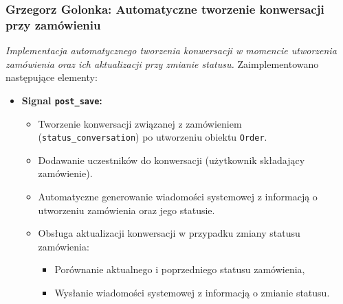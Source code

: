 \documentclass[12pt,a4paper,oneside]{article}
\theoremstyle{definition}
\numberwithin{equation}{section}
\begin{document}
\subsubsection{Grzegorz Golonka: Automatyczne tworzenie konwersacji przy zamówieniu}
\label{section:1.3.31}
\textit{
Implementacja automatycznego tworzenia konwersacji w momencie utworzenia zamówienia oraz ich aktualizacji przy zmianie statusu.
}
Zaimplementowano następujące elementy:
\begin{itemize}
    \item \textbf{Signal \texttt{post\_save}:}
    \begin{itemize}
        \item Tworzenie konwersacji związanej z zamówieniem\\ (\texttt{status\_conversation}) po utworzeniu obiektu \texttt{Order}.
        \item Dodawanie uczestników do konwersacji (użytkownik składający zamówienie).
        \item Automatyczne generowanie wiadomości systemowej z informacją o utworzeniu zamówienia oraz jego statusie.
        \item Obsługa aktualizacji konwersacji w przypadku zmiany statusu zamówienia:
        \begin{itemize}
            \item Porównanie aktualnego i poprzedniego statusu zamówienia,
            \item Wysłanie wiadomości systemowej z informacją o zmianie statusu.
        \end{itemize}
    \end{itemize}
\end{itemize}
%
%
\end{document}
